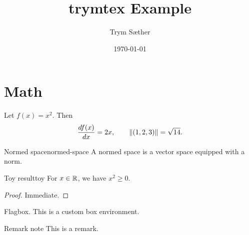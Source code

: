\documentclass{article}
\title{trymtex Example}
\author{Trym Sæther}
\date{\today}
\begin{document}
\maketitle
\tableofcontents

\section{Math}

Let $f(x)=x^2$. Then
\[
  \dd[f(x)]{x} = 2x,
  \qquad
  \norm{(1,2,3)} = \sqrt{14}.
\]

\begin{definition}{Normed space}{normed-space}
  A normed space is a vector space equipped with a norm.
\end{definition}

\begin{theorem}{Toy result}{toy}
  For $x \in \R$, we have $x^2 \ge 0$.
\end{theorem}

\begin{proof}
  Immediate.
\end{proof}

\begin{flagbox}{Flagbox.}{}
  This is a custom box environment.
\end{flagbox}

\begin{remark}{Remark note}{}
  This is a remark.
\end{remark}
\end{document}

